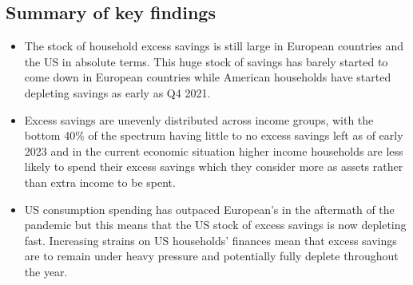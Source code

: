 \subsection{Summary of key findings}
\begin{itemize}
    \item The stock of household excess savings is still large in European countries and the US in absolute terms. This huge stock of savings has barely started to come down in European countries while American households have started depleting savings as early as Q4 2021. 
    \item Excess savings are unevenly distributed across income groups, with the bottom 40\% of the spectrum having little to no excess savings left as of early 2023 and in the current economic situation higher income households are less likely to spend their excess savings which they consider more as assets rather than extra income to be spent.
    \item US consumption spending has outpaced European’s in the aftermath of the pandemic but this means that the US stock of excess savings is now depleting fast. Increasing strains on US households’ finances mean that excess savings are to remain under heavy pressure and potentially fully deplete throughout the year.
\end{itemize}